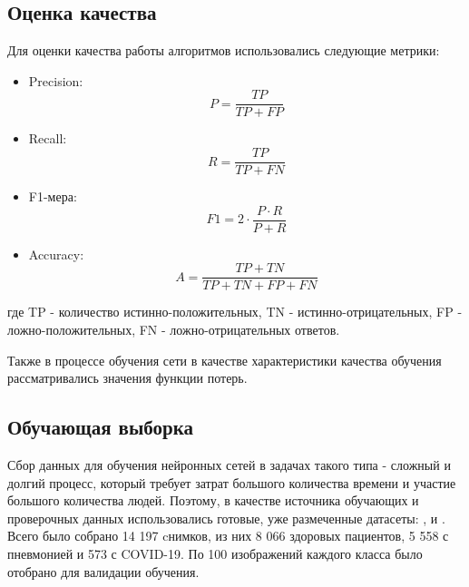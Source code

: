 
\subsection{Оценка качества}
Для оценки качества работы алгоритмов использовались следующие метрики:
\begin{itemize}
    \item Precision: \[P = \frac{TP}{TP+FP}\]
    \item Recall: \[R=\frac{TP}{TP+FN}\] 
    \item F1-мера: \[F1=2 \cdot \frac{P \cdot R}{P+R}\] 
    \item Accuracy: \[A=\frac{TP+TN}{TP+TN+FP+FN}\] 
\end{itemize}
где TP - количество истинно-положительных, TN - истинно-отрицательных, FP - ложно-положительных, FN - ложно-отрицательных ответов.

Также в процессе обучения сети в качестве характеристики качества обучения рассматривались значения функции потерь.

\subsection{Обучающая выборка}
Сбор данных для обучения нейронных сетей в задачах такого типа - сложный и долгий процесс, который требует затрат большого количества времени и участие большого количества людей. Поэтому, в качестве источника обучающих и проверочных данных использовались готовые, уже размеченные датасеты: \cite{tawsifurrahman}, \cite{cohen2020covid} и \cite{wang2020covidnet}. 
Всего было собрано 14 197 cнимков, из них 8 066 здоровых пациентов, 5 558 с пневмонией и 573 с COVID-19. По 100 изображений каждого класса было отобрано для валидации обучения.

